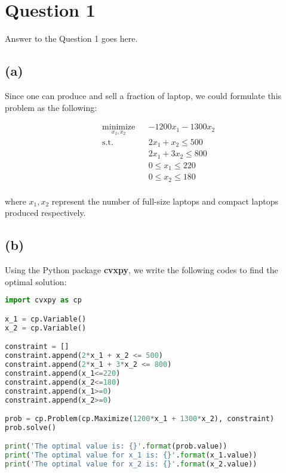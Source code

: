 \documentclass[12pt,letterpaper]{article}
\begin{document}
\section*{Question 1}

Answer to the Question 1 goes here.

\subsection*{(a)}

Since one can produce and sell a fraction of laptop, we could formulate this problem as the following:

\begin{equation}
\begin{aligned}
& \underset{x_1, x_2}{\text{minimize}}
& & -1200x_1 - 1300x_2 \\
& \text{s.t.} & &  2x_1+x_2 \leq 500 \\
& & & 2x_1+3x_2 \leq 800 \\
& & &  0 \leq x_1 \leq 220 \\
& & &  0 \leq x_2 \leq 180 \\
\end{aligned}
\label{optimization1_1}
\end{equation}

where $x_1, x_2$ represent the number of full-size laptops and compact laptops produced respectively. 

\subsection*{(b)}

Using the Python package \textbf{cvxpy}, we write the following codes to find the optimal solution:

\begin{lstlisting}[language=Python, caption=Question 1.b]
import cvxpy as cp

x_1 = cp.Variable()
x_2 = cp.Variable()

constraint = []
constraint.append(2*x_1 + x_2 <= 500)
constraint.append(2*x_1 + 3*x_2 <= 800)
constraint.append(x_1<=220)
constraint.append(x_2<=180)
constraint.append(x_1>=0)
constraint.append(x_2>=0)

prob = cp.Problem(cp.Maximize(1200*x_1 + 1300*x_2), constraint)
prob.solve()

print('The optimal value is: {}'.format(prob.value))
print('The optimal value for x_1 is: {}'.format(x_1.value))
print('The optimal value for x_2 is: {}'.format(x_2.value))
\end{lstlisting}
\end{document}
